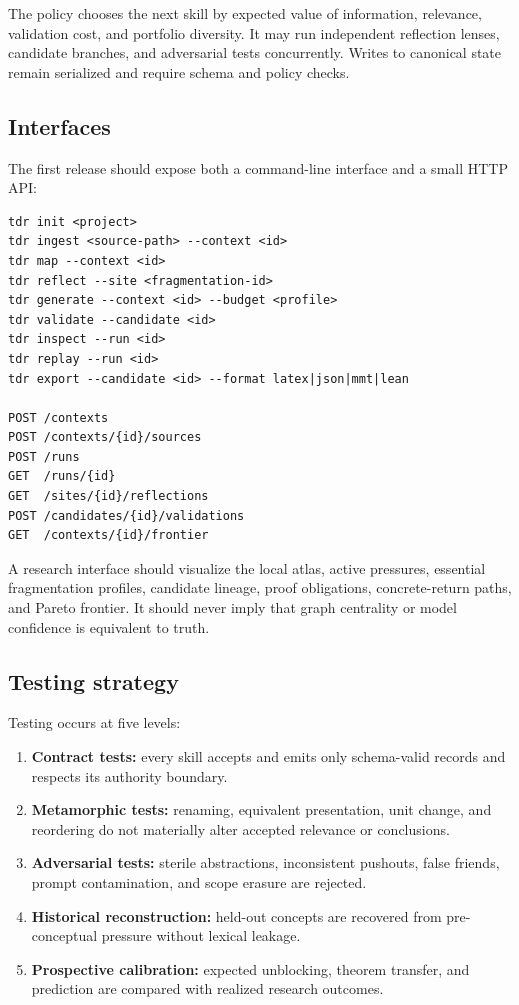 \documentclass[11pt]{article}
\begin{document}
The policy chooses the next skill by expected value of information, relevance, validation cost, and
portfolio diversity. It may run independent reflection lenses, candidate branches, and adversarial
tests concurrently. Writes to canonical state remain serialized and require schema and policy checks.

\subsection{Interfaces}

The first release should expose both a command-line interface and a small HTTP API:
\begin{lstlisting}[style=spec,caption={Minimum external interface.}]
tdr init <project>
tdr ingest <source-path> --context <id>
tdr map --context <id>
tdr reflect --site <fragmentation-id>
tdr generate --context <id> --budget <profile>
tdr validate --candidate <id>
tdr inspect --run <id>
tdr replay --run <id>
tdr export --candidate <id> --format latex|json|mmt|lean

POST /contexts
POST /contexts/{id}/sources
POST /runs
GET  /runs/{id}
GET  /sites/{id}/reflections
POST /candidates/{id}/validations
GET  /contexts/{id}/frontier
\end{lstlisting}

A research interface should visualize the local atlas, active pressures, essential fragmentation
profiles, candidate lineage, proof obligations, concrete-return paths, and Pareto frontier. It should
never imply that graph centrality or model confidence is equivalent to truth.

\subsection{Testing strategy}

Testing occurs at five levels:
\begin{enumerate}
  \item \textbf{Contract tests:} every skill accepts and emits only schema-valid records and respects
  its authority boundary.
  \item \textbf{Metamorphic tests:} renaming, equivalent presentation, unit change, and reordering do not
  materially alter accepted relevance or conclusions.
  \item \textbf{Adversarial tests:} sterile abstractions, inconsistent pushouts, false friends, prompt
  contamination, and scope erasure are rejected.
  \item \textbf{Historical reconstruction:} held-out concepts are recovered from pre-conceptual
  pressure without lexical leakage.
  \item \textbf{Prospective calibration:} expected unblocking, theorem transfer, and prediction are
  compared with realized research outcomes.
\end{enumerate}
\end{document}
